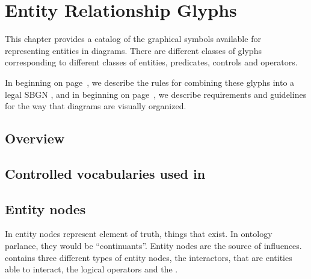 
\chapter{Entity Relationship Glyphs}

This chapter provides a catalog of the graphical symbols available for representing entities in \ER diagrams.  There are different classes of glyphs corresponding to different classes of entities, predicates, controls and operators.

In  beginning on page~\pageref{chp:grammar}, we describe the rules for combining these glyphs into a legal SBGN \ER, and in  beginning on page~\pageref{chp:layout}, we describe requirements and guidelines for the way that diagrams are visually organized.

\section{Overview}
 

 
\section{Controlled vocabularies used in \SBGNERLone}\label{sec:CVs}


 
 
\section{Entity nodes}\label{sec:ENs}

In \SBGNERLone{} entity nodes represent element of truth, things that exist. In ontology parlance, they would be ``continuants''. Entity nodes are the source of influences. \SBGNERLone{} contains three different types of entity nodes, the interactors, that are entities able to interact, the logical operators and the . 


